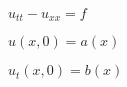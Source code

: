 \documentclass{article}
\begin{document}
$ u_{tt} - u_{xx} = f $
\pagebreak

$ u(x,0) = a(x) $
\pagebreak

$ u_{t}(x,0) = b(x) $
\pagebreak
\end{document}

